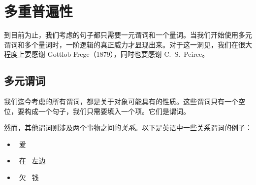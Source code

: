 
\chapter{多重普遍性}\label{s:MultipleGenerality}
到目前为止，我们考虑的句子都只需要一元谓词和一个量词。当我们开始使用多元谓词和多个量词时，一阶逻辑的真正威力才显现出来。对于这一洞见，我们在很大程度上要感谢 \foreignlanguage{german}{Gottlob Frege}（1879），同时也要感谢 C.~S.~Peirce。

\section{多元谓词}
我们迄今考虑的所有谓词，都是关于对象可能具有的性质。这些谓词只有一个空位，要构成一个句子，我们只需要填入一个项。它们是谓词。

然而，其他谓词则涉及两个事物之间的\emph{关系}。以下是英语中一些关系谓词的例子：

\begin{itemize}
		\item \blank\ 爱 \blank
		\item \blank\ 在 \blank\ 左边
		\item \blank\ 欠 \blank\ 钱
	\end{itemize}

